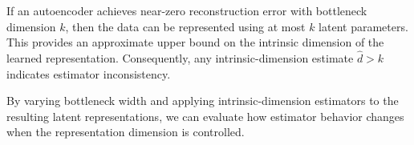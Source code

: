 \documentclass[11pt]{article}
\begin{document}
If an autoencoder achieves near-zero reconstruction error with bottleneck dimension $k$, then the data can be represented using at most $k$ latent parameters. This provides an approximate upper bound on the intrinsic dimension of the learned representation. Consequently, any intrinsic-dimension estimate $\hat d > k$ indicates estimator inconsistency.

By varying bottleneck width and applying intrinsic-dimension estimators to the resulting latent representations, we can evaluate how estimator behavior changes when the representation dimension is controlled.


















\end{document}
